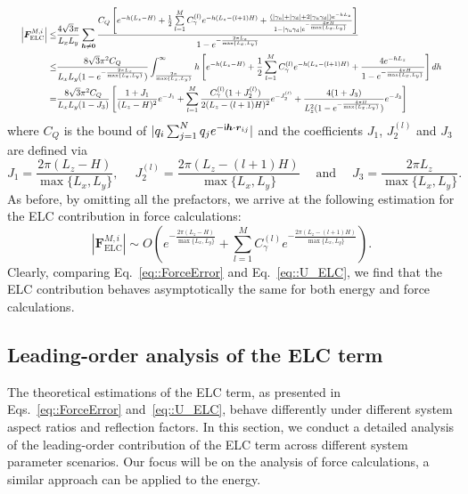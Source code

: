 \begin{equation}
\resizebox{0.98\hsize}{!}{$
\begin{split}
\left|\bm{F}_{\text{ELC}}^{M,i}\right|\leq &\frac{4\sqrt{3}\pi}{L_xL_y}\sum_{\bm{h}\neq \bm{0}} \frac{C_Q\left[e^{-h(L_z-H)}+\frac{1}{2}\sum\limits_{l=1}^{M}C^{(l)}_{\gamma}e^{-h(L_z-(l+1)H)}+\frac{(|\gamma_{\T u}|+|\gamma_{\T d}| + 2|\gamma_{\T u}\gamma_{\T d}|)e^{-hL_z}}{1-|\gamma_{\T u}\gamma_{\T d}|e^{-\frac{4\pi H}{\max\{L_x,L_y\}}}}\right]}{1-e^{-\frac{2\pi L_z}{\max\{L_x,L_y\}}}}\\
\leq& \frac{8\sqrt{3}\pi^2 C_Q}{L_xL_y(1-e^{-\frac{2\pi L_z}{\max\{L_x,L_y\}}})}\int_{\frac{2\pi}{\max\{L_x,L_y\}}}^{\infty}h\left[e^{-h(L_z-H)}+\frac{1}{2}\sum\limits_{l=1}^{M}C^{(l)}_{\gamma}e^{-h(L_z-(l+1)H)}+\frac{4e^{-hL_z}}{1-e^{-\frac{4\pi H}{\max\{L_x,L_y\}}}}\right]dh\\
=&\frac{8\sqrt{3}\pi^2 C_Q}{L_xL_y(1-J_3)}\left[\frac{1+J_1}{(L_z-H)^2}e^{-J_1}+\sum_{l=1}^{M}\frac{C_{\gamma}^{(l)}(1+J_2^{(l)})}{2(L_z-(l+1)H)^2}e^{-J_2^{(l)}}+\frac{4(1+J_3)}{L_z^2(1-e^{-\frac{4\pi H}{\max\{L_x,L_y\}}})}e^{-J_3}\right]
\end{split}
$}
\end{equation}
where $C_Q$ is the bound of $|q_i\sum_{j=1}^{N}q_je^{-\mathsf i \bm{h}\cdot\bm{r}_{ij}}|$ and the coefficients $J_1$, $J_2^{(l)}$ and $J_3$ are defined via
\begin{equation}
J_1=\frac{2\pi(L_z-H)}{\max\{L_x,L_y\}},\quad\; J_2^{(l)}= \frac{2\pi(L_z-(l+1)H)}{\max\{L_x,L_y\}}\quad \;\text{and} \quad \; J_3=\frac{2\pi L_z}{\max\{L_x,L_y\}}.
\end{equation}
As before, by omitting all the prefactors, we arrive at the following estimation for the ELC contribution in force calculations:
\begin{equation}\label{eq::ForceError}
\left|\bm{F}_{\text{ELC}}^{M,i}\right|\sim O\left(e^{-\frac{2\pi(L_z-H)}{\max\{L_x,L_y\}}}+\sum_{l=1}^{M}C_{\gamma}^{(l)}e^{-\frac{2\pi(L_z-(l+1)H)}{\max\{L_x,L_y\}}}\right).
\end{equation}
Clearly, comparing Eq.~\eqref{eq::ForceError} and Eq.~\eqref{eq::U_ELC}, we find that the ELC contribution behaves asymptotically the same for both energy and force calculations.

\subsection{Leading-order analysis of the ELC term}\label{sec::leadingerr}
The theoretical estimations of the ELC term, as presented in Eqs.~\eqref{eq::ForceError} and~\eqref{eq::U_ELC}, behave differently under different system aspect ratios and reflection factors.
In this section, we conduct a detailed analysis of the leading-order contribution of the ELC term across different system parameter scenarios. 
Our focus will be on the analysis of force calculations, a similar approach can be applied to the energy.

